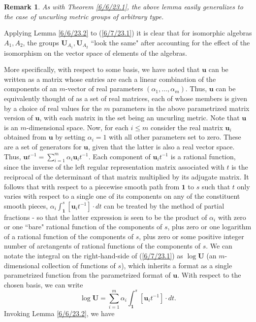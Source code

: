 \documentclass{amsart}
\numberwithin{equation}{section}
\newtheorem{remark}[theorem]{Remark}
\theoremstyle{definition}
\numberwithin{theorem}{section}
\begin{document}
\begin{remark} {\rm As with Theorem \ref{6/6/23.1}, the above lemma easily generalizes to the case of uncurling metric groups of arbitrary type.}\end{remark}

Applying Lemma \ref{6/6/23.2} to (\ref{6/7/23.1}) it is clear that for isomorphic algebras $A_1,A_2$, the groups $\mathbf{U}_{A_1},  \mathbf{U}_{A_2}$ ``look the same" after accounting for the effect of the isomorphism on the vector space of elements of the algebras.

More specifically, with respect to some basis, we have noted that $\mathbf{u}$ can be written as a matrix whose entries are each a linear combination of the components of an $m$-vector of real parameters $(\alpha_1, \dots, \alpha_m)$.   Thus, $\mathbf{u}$ can be equivalently thought of as a set of real matrices, each of whose members is given by a choice of real values for the $m$ parameters in the above parametrized matrix version of $\mathbf{u}$, with each matrix in the set being an uncurling metric.   Note that $\mathbf{u}$ is an $m$-dimensional space.    Now, for each $i\le m$ consider the real matrix  $\mathbf{u}_i$ obtained from $\mathbf{u}$ by setting $\alpha_i =1$ with all other parameters set to zero.  These are a set of generators for $\mathbf{u}$, given that the latter is also a real vector space. Thus, $\mathbf{u}t^{-1} = \sum_{i=1}^m \alpha_i \mathbf{u}_i t^{-1}$.   Each component of $\mathbf{u}_i t^{-1}$ is a rational function, since the inverse of the left regular representation matrix associated with $t$ is the reciprocal of the determinant of that matrix multiplied by its adjugate matrix.  It follows that  with respect to a piecewise smooth path from $\mathbf{1}$ to $s$ such that $t$ only varies with respect to a single one of its components on any of the constituent smooth pieces, $\alpha_i \int_{\mathbf{1}}^s [\mathbf{u}_i t^{-1}]\cdot dt$ can be treated by the method of partial fractions - so that the latter expression is seen to be the product of $\alpha_i$ with zero or one ``bare" rational function of the components of $s$, plus zero or one logarithm of a rational function of the components of $s$, plus zero or some positive integer number of arctangents of rational functions of the components of $s$.  We can notate the integral on the right-hand-side of (\ref{6/7/23.1}) as $\log  \mathbf{U}$ (an $m$-dimensional collection of functions of $s$), which inherits a format as a single parametrized function from the parametrized format of $\mathbf{u}$.   With respect to the chosen basis, we can write \begin{equation}\label{9/26/23.1} \log  \mathbf{U} =\sum_{i=1}^m \alpha_i \int_{\mathbf{1}}^s [\mathbf{u}_i t^{-1}]\cdot dt.\end{equation}   Invoking Lemma \ref{6/6/23.2}, we have   
\end{document}
